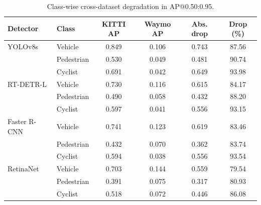 \begin{table}[t]
    \centering
    \caption{Class-wise cross-dataset degradation in AP@0.50:0.95.}
    \label{tab:class_wise_degradation}
    \begin{tabular}{llcccc}
        \toprule
        Detector & Class & KITTI AP & Waymo AP & Abs. drop & Drop (\%) \\
        \midrule
        YOLOv8s & Vehicle & 0.849 & 0.106 & 0.743 & 87.56 \\
         & Pedestrian & 0.530 & 0.049 & 0.481 & 90.74 \\
         & Cyclist & 0.691 & 0.042 & 0.649 & 93.98 \\
        \addlinespace
        RT-DETR-L & Vehicle & 0.730 & 0.116 & 0.615 & 84.17 \\
         & Pedestrian & 0.490 & 0.058 & 0.432 & 88.20 \\
         & Cyclist & 0.597 & 0.041 & 0.556 & 93.15 \\
        \addlinespace
        Faster R-CNN & Vehicle & 0.741 & 0.123 & 0.619 & 83.46 \\
         & Pedestrian & 0.432 & 0.070 & 0.362 & 83.74 \\
         & Cyclist & 0.594 & 0.038 & 0.556 & 93.54 \\
        \addlinespace
        RetinaNet & Vehicle & 0.703 & 0.144 & 0.559 & 79.54 \\
         & Pedestrian & 0.391 & 0.075 & 0.317 & 80.93 \\
         & Cyclist & 0.518 & 0.072 & 0.446 & 86.08 \\
        \bottomrule
    \end{tabular}
\end{table}
